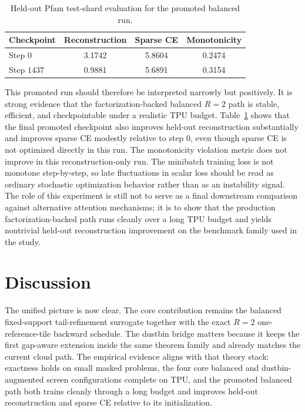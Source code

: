 \documentclass{article}
\begin{document}
\begin{table}[h]
    \centering
    \begin{tabular}{@{}lccc@{}}
        \toprule
        Checkpoint & Reconstruction & Sparse CE & Monotonicity \\
        \midrule
        Step $0$ & 3.1742 & 5.8604 & 0.2474 \\
        Step $1437$ & 0.9881 & 5.6891 & 0.3154 \\
        \bottomrule
    \end{tabular}
    \caption{Held-out Pfam test-shard evaluation for the promoted balanced run.}
    \label{tab:heldout_promoted}
\end{table}

This promoted run should therefore be interpreted narrowly but positively. It is strong evidence that the factorization-backed balanced $R=2$ path is stable, efficient, and checkpointable under a realistic TPU budget. Table~\ref{tab:heldout_promoted} shows that the final promoted checkpoint also improves held-out reconstruction substantially and improves sparse CE modestly relative to step $0$, even though sparse CE is not optimized directly in this run. The monotonicity violation metric does not improve in this reconstruction-only run. The minibatch training loss is not monotone step-by-step, so late fluctuations in scalar loss should be read as ordinary stochastic optimization behavior rather than as an instability signal. The role of this experiment is still not to serve as a final downstream comparison against alternative attention mechanisms; it is to show that the production factorization-backed path runs cleanly over a long TPU budget and yields nontrivial held-out reconstruction improvement on the benchmark family used in the study.

\section{Discussion}

The unified picture is now clear. The core contribution remains the balanced fixed-support tail-refinement surrogate together with the exact $R=2$ one-reference-tile backward schedule. The dustbin bridge matters because it keeps the first gap-aware extension inside the same theorem family and already matches the current cloud path. The empirical evidence aligns with that theory stack: exactness holds on small masked problems, the four core balanced and dustbin-augmented screen configurations complete on TPU, and the promoted balanced path both trains cleanly through a long budget and improves held-out reconstruction and sparse CE relative to its initialization.
\end{document}

